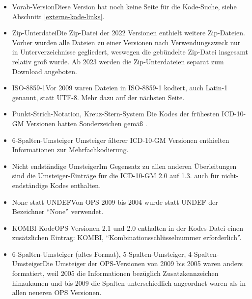\newpage

\label{abweichungen}

\begin{itemize}
\item Vorab-Version\newline Diese Version hat noch keine Seite für die Kode-Suche, siehe Abschnitt \ref{externe-kode-links}.
\item Zip-Unterdatei\newline Die Zip-Datei der 2022 Versionen enthielt weitere Zip-Dateien. Vorher wurden alle Dateien zu einer Versionen nach Verwendungszweck nur in Unterverzeichnisse gegliedert, weswegen die gebündelte Zip-Datei insgesamt relativ groß wurde. Ab 2023 werden die Zip-Unterdateien separat zum Download angeboten.
\item ISO-8859-1\newline Vor 2009 waren Dateien in ISO-8859-1 kodiert, auch Latin-1 genannt, statt UTF-8. Mehr dazu auf der nächsten Seite.
\item Punkt-Strich-Notation, Kreuz-Stern-System \newline Die Kodes der frühesten ICD-10-GM Versionen hatten Sonderzeichen gemäß \cite[Kategorie und Kode in der ICD-10-GM]{bfarmicdkk}.
\item 6-Spalten-Umsteiger \newline Umsteiger älterer ICD-10-GM Versionen enthielten Informationen zur Mehrfachkodierung. 
\item Nicht endständige Umsteiger\newline Im Gegensatz zu allen anderen Überleitungen sind die Umsteiger-Einträge für die ICD-10-GM 2.0 auf 1.3. auch für nicht-endständige Kodes enthalten. 
\item None statt UNDEF\newline Von OPS 2009 bis 2004 wurde statt UNDEF der Bezeichner "`None"' verwendet. 
\item KOMBI-Kode\newline OPS Versionen 2.1 und 2.0 enthalten in der Kodes-Datei einen zusätzlichen Eintrag: KOMBI, "`Kombinationsschlüsselnummer erforderlich"'. 
\item 6-Spalten-Umsteiger (altes Format), 5-Spalten-Umsteiger, 4-Spalten-Umsteiger\newline Die Umsteiger der OPS-Versionen von 2009 bis 2005 waren anders formatiert, weil 2005 die Informationen bezüglich Zusatzkennzeichen hinzukamen und bis 2009 die Spalten unterschiedlich angeordnet waren als in allen neueren OPS Versionen. 

\end{itemize}
